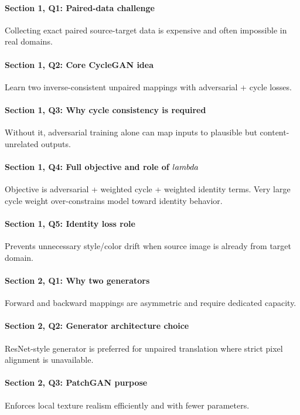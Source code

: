 \documentclass[conference]{IEEEtran}
\begin{document}
\paragraph{Section 1, Q1: Paired-data challenge}
Collecting exact paired source-target data is expensive and often impossible in real domains.

\paragraph{Section 1, Q2: Core CycleGAN idea}
Learn two inverse-consistent unpaired mappings with adversarial + cycle losses.

\paragraph{Section 1, Q3: Why cycle consistency is required}
Without it, adversarial training alone can map inputs to plausible but content-unrelated outputs.

\paragraph{Section 1, Q4: Full objective and role of $\\lambda$}
Objective is adversarial + weighted cycle + weighted identity terms. Very large cycle weight over-constrains model toward identity behavior.

\paragraph{Section 1, Q5: Identity loss role}
Prevents unnecessary style/color drift when source image is already from target domain.

\paragraph{Section 2, Q1: Why two generators}
Forward and backward mappings are asymmetric and require dedicated capacity.

\paragraph{Section 2, Q2: Generator architecture choice}
ResNet-style generator is preferred for unpaired translation where strict pixel alignment is unavailable.

\paragraph{Section 2, Q3: PatchGAN purpose}
Enforces local texture realism efficiently and with fewer parameters.
\end{document}
